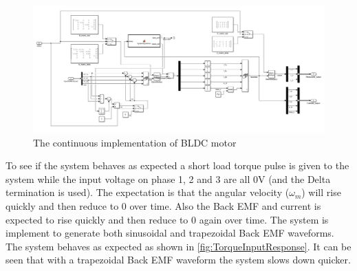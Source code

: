 \documentclass[]{report}
\begin{document}
\begin{figure}[H]
	\centering
	\includegraphics[width=\textwidth]{Matlab/SimulinkNonlinearModel_StarAndDelta.JPG}
	\caption{The continuous implementation of BLDC motor}
	\label{fig:SimulinkNonlinearModel}
\end{figure}

To see if the system behaves as expected a short load torque pulse is given to the system while the input voltage on phase 1, 2 and 3 are all 0V (and the Delta termination is used). The expectation is that the angular velocity ($\omega_m$) will rise quickly and then reduce to 0 over time. Also the Back EMF and current is expected to rise quickly and then reduce to 0 again over time. The system is implement to generate both sinusoidal and trapezoidal Back EMF waveforms. The system behaves as expected as shown in \autoref{fig:TorqueInputResponse}. It can be seen that with a trapezoidal Back EMF waveform the system slows down quicker.
\end{document}
